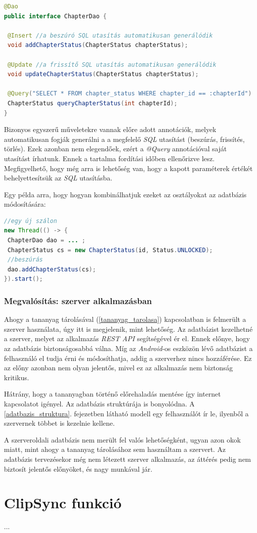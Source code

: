 \documentclass[12pt,a4paper]{article}
\begin{document}
	\begin{lstlisting}[language=Java]
@Dao
public interface ChapterDao {
	
 @Insert //a beszúró SQL utasítás automatikusan generálódik
 void addChapterStatus(ChapterStatus chapterStatus);
	
 @Update //a frissítő SQL utasítás automatikusan generálódik
 void updateChapterStatus(ChapterStatus chapterStatus);
	
 @Query("SELECT * FROM chapter_status WHERE chapter_id == :chapterId")
 ChapterStatus queryChapterStatus(int chapterId);
}
	\end{lstlisting}

	Bizonyos egyszerű műveletekre vannak előre adott annotációk, melyek automatikusan fogják generálni a a megfelelő \textit{SQL} utasítást (beszúrás, frissítés, törlés). Ezek azonban nem elegendőek, ezért a \textit{@Query} annotációval saját utasítást írhatunk. Ennek a tartalma fordítási időben ellenőrizve lesz. Megfigyelhető, hogy még arra is lehetőség van, hogy a kapott paraméterek értékét behelyettesítsük az \textit{SQL} utasításba.

	Egy példa arra, hogy hogyan kombinálhatjuk ezeket az osztályokat az adatbázis módosítására:
	
	\begin{lstlisting}[language=Java]
//egy új szálon
new Thread(() -> {
 ChapterDao dao = ... ;
 ChapterStatus cs = new ChapterStatus(id, Status.UNLOCKED);
 //beszúrás
 dao.addChapterStatus(cs);
}).start();
	\end{lstlisting}
	
	\subsubsection{Megvalósítás: szerver alkalmazásban}
	
	Ahogy a tananyag tárolásával (\ref{tananyag_tarolasa}) kapcsolatban is felmerült a szerver használata, úgy itt is megjelenik, mint lehetőség. Az adatbázist kezelhetné a szerver, melyet az alkalmazás \textit{REST API} segítségével ér el. Ennek előnye, hogy az adatbázis biztonságosabbá válna. Míg az \textit{Android}-os eszközön lévő adatbázist a felhasználó el tudja érni és módosíthatja, addig a szerverhez nincs hozzáférése. Ez az előny azonban nem olyan jelentős, mivel ez az alkalmazás nem biztonság kritikus. 
	
	Hátrány, hogy a tananyagban történő előrehaladás mentése így internet kapcsolatot igényel. Az adatbázis struktúrája is bonyolódna. A \ref{adatbazis_struktura}. fejezetben látható modell egy felhasználót ír le, ilyenből a szervernek többet is kezelnie kellene.
	
	A szerveroldali adatbázis nem merült fel valós lehetőségként, ugyan azon okok miatt, mint ahogy a tananyag tárolásához sem használtam a szervert. Az adatbázis tervezésekor még nem létezett szerver alkalmazás, az áttérés pedig nem biztosít jelentős előnyöket, és nagy munkával jár.

	\section{ClipSync funkció}\label{clipsync}
	
	...
\end{document}
